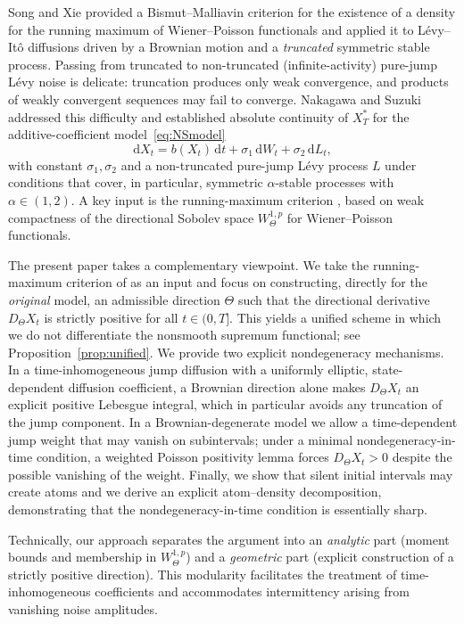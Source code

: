 \documentclass[11pt]{article}
\newcommand{\1}{\mathbf{1}}
\newcommand{\dd}{\mathrm{d}}
\newcommand{\dt}{\,\dd t}
\newcommand{\Xstar}{X^{\ast}}
\theoremstyle{plain}
\theoremstyle{definition}
\theoremstyle{remark}
\begin{document}
Song and Xie \cite{SongXie2018} provided a Bismut--Malliavin criterion for the existence of a density for the running maximum of Wiener--Poisson functionals
and applied it to L\'evy--It\^o diffusions driven by a Brownian motion and a \emph{truncated} symmetric stable process.
Passing from truncated to non-truncated (infinite-activity) pure-jump L\'evy noise is delicate: truncation produces only weak convergence,
and products of weakly convergent sequences may fail to converge.
Nakagawa and Suzuki \cite{NakagawaSuzuki2024} addressed this difficulty and established absolute continuity of $\Xstar_T$ for the additive-coefficient model~\eqref{eq:NSmodel}
\begin{equation}\label{eq:NSmodel}
\dd X_t=b(X_t)\dt+\sigma_1\,\dd W_t+\sigma_2\,\dd L_t,
\end{equation}
with constant $\sigma_1,\sigma_2$ and a non-truncated pure-jump L\'evy process $L$ under conditions that cover, in particular, symmetric $\alpha$-stable processes with $\alpha\in(1,2)$.
A key input is the running-maximum criterion \cite[Lemma~4.1]{NakagawaSuzuki2024}, based on weak compactness of the directional Sobolev space $W^{1,p}_\Theta$
for Wiener--Poisson functionals.

\medskip
The present paper takes a complementary viewpoint.
We take the running-maximum criterion of \cite{NakagawaSuzuki2024} as an input and focus on constructing, directly for the \emph{original} model,
an admissible direction $\Theta$ such that the directional derivative $D_\Theta X_t$ is strictly positive for all $t\in(0,T]$.
This yields a unified scheme in which we do not differentiate the nonsmooth supremum functional; see Proposition~\ref{prop:unified}.
We provide two explicit nondegeneracy mechanisms.
In a time-inhomogeneous jump diffusion with a uniformly elliptic, state-dependent diffusion coefficient,
a Brownian direction alone makes $D_\Theta X_t$ an explicit positive Lebesgue integral, which in particular avoids any truncation of the jump component.
In a Brownian-degenerate model we allow a time-dependent jump weight that may vanish on subintervals;
under a minimal nondegeneracy-in-time condition, a weighted Poisson positivity lemma forces $D_\Theta X_t>0$ despite the possible vanishing of the weight.
Finally, we show that silent initial intervals may create atoms and we derive an explicit atom--density decomposition,
demonstrating that the nondegeneracy-in-time condition is essentially sharp.

Technically, our approach separates the argument into an \emph{analytic} part (moment bounds and membership in $W^{1,p}_\Theta$)
and a \emph{geometric} part (explicit construction of a strictly positive direction).
This modularity facilitates the treatment of time-inhomogeneous coefficients and accommodates intermittency arising from vanishing noise amplitudes.
\end{document}
